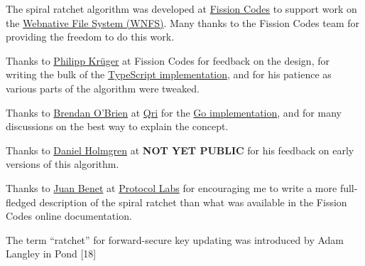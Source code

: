 \documentclass{article}
\begin{document}
    The spiral ratchet algorithm was developed at \href{https://fission.codes}{Fission Codes} to support work on the \href{https://github.com/fission-suite/webnative}{Webnative File System (WNFS)}. Many thanks to the Fission Codes team for providing the freedom to do this work.
    
    Thanks to \href{https://github.com/matheus23/}{Philipp Krüger} at Fission Codes for  feedback on the design, for writing the bulk of the \href{https://github.com/fission-suite/webnative/blob/e1eed4e750c668a6f54d9be701dc17e286b9eff4/src/fs/data/private/spiralratchet.ts}{TypeScript implementation}, and for his patience as various parts of the algorithm were tweaked.
    
    Thanks to \href{https://github.com/b5/}{Brendan O'Brien} at \href{https://qri.io/}{Qri} for the \href{https://github.com/qri-io/wnfs-go/blob/62915924c866f7106aecacccd14e57bd1b62850f/private/ratchet/ratchet.go}{Go implementation}, and for many discussions on the best way to explain the concept.
    
    Thanks to \href{https://github.com/dholms}{Daniel Holmgren} at \textbf{NOT YET PUBLIC} for his feedback on early versions of this algorithm.
    
    Thanks to \href{https://github.com/jbenet/}{Juan Benet} at \href{https://protocol.ai/}{Protocol Labs} for encouraging me to write a more full-fledged description of the spiral ratchet than what was available in the Fission Codes online documentation.
    
    The term “ratchet” for forward-secure key updating was introduced by Adam Langley in Pond [18]
    
    
\end{document}

